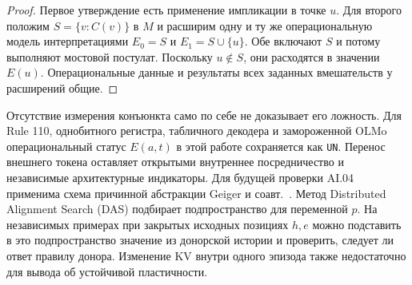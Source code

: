 \begin{proof}
Первое утверждение есть применение импликации в точке $u$. Для второго положим $S=\{v:C(v)\}$ в $M$ и расширим одну и ту же операциональную модель интерпретациями $E_0=S$ и $E_1=S\cup\{u\}$. Обе включают $S$ и потому выполняют мостовой постулат. Поскольку $u\notin S$, они расходятся в значении $E(u)$. Операциональные данные и результаты всех заданных вмешательств у расширений общие.
\end{proof}
Отсутствие измерения конъюнкта само по себе не доказывает его ложность. Для Rule 110, однобитного регистра, табличного декодера и замороженной OLMo операциональный статус $E(a,t)$ в этой работе сохраняется как \texttt{UN}. Перенос внешнего токена оставляет открытыми внутреннее посредничество и независимые архитектурные индикаторы. Для будущей проверки AI.04 применима схема причинной абстракции Geiger и соавт.~\cite{geiger2025}. Метод Distributed Alignment Search (DAS) подбирает подпространство для переменной $p$. На независимых примерах при закрытых исходных позициях $h,e$ можно подставить в это подпространство значение из донорской истории и проверить, следует ли ответ правилу донора. Изменение KV внутри одного эпизода также недостаточно для вывода об устойчивой пластичности.
